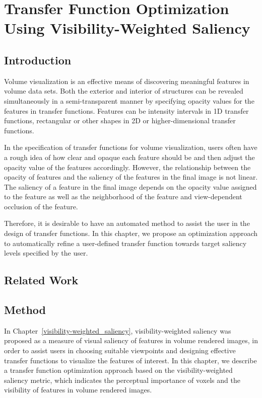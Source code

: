 \chapter{Transfer Function Optimization Using Visibility-Weighted Saliency}

\section{Introduction}
Volume visualization is an effective means of discovering meaningful features in volume data sets.
Both the exterior and interior of structures can be revealed simultaneously in a semi-transparent manner by specifying opacity values for the features in transfer functions.
Features can be intensity intervals in 1D transfer functions, rectangular or other shapes in 2D or higher-dimensional transfer functions.

In the specification of transfer functions for volume visualization, users often have a rough idea of how clear and opaque each feature should be and then adjust the opacity value of the features accordingly.
However, the relationship between the opacity of features and the saliency of the features in the final image is not linear.
The saliency of a feature in the final image depends on the opacity value assigned to the feature as well as the neighborhood of the feature and view-dependent occlusion of the feature.

Therefore, it is desirable to have an automated method to assist the user in the design of transfer functions. In this chapter, we propose an optimization approach to automatically refine a user-defined transfer function towards target saliency levels specified by the user.

\section{Related Work}

\section{Method}
In Chapter~\ref{visibility-weighted_saliency}, visibility-weighted saliency was proposed as a measure of visual saliency of features in volume rendered images, in order to assist users in choosing suitable viewpoints and designing effective transfer functions to visualize the features of interest. In this chapter, we describe a transfer function optimization approach based on the visibility-weighted saliency metric, which indicates the perceptual importance of voxels and the visibility of features in volume rendered images.

